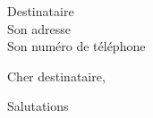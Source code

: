 \documentclass[a4paper,11pt]{letter}
\begin{document}
\begin{letter}{Destinataire\\Son adresse\\Son numéro de téléphone}
	
\opening{Cher destinataire,}


\closing{Salutations}


\end{letter}
\end{document}

